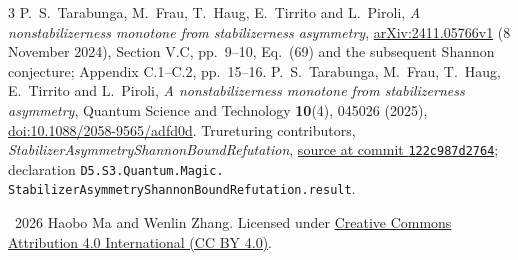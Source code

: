 \documentclass[11pt]{article}
\begin{document}
\begin{thebibliography}{3}
 P.~S.~Tarabunga, M.~Frau, T.~Haug, E.~Tirrito and L.~Piroli,
\emph{A nonstabilizerness monotone from stabilizerness asymmetry},
\href{https://arxiv.org/abs/2411.05766v1}{arXiv:2411.05766v1} (8 November 2024),
Section V.C, pp.~9--10, Eq.~(69) and the subsequent Shannon conjecture;
Appendix C.1--C.2, pp.~15--16.
 P.~S.~Tarabunga, M.~Frau, T.~Haug, E.~Tirrito and L.~Piroli,
\emph{A nonstabilizerness monotone from stabilizerness asymmetry},
Quantum Science and Technology \textbf{10}(4), 045026 (2025),
\href{https://doi.org/10.1088/2058-9565/adfd0d}{doi:10.1088/2058-9565/adfd0d}.
 Trureturing contributors,
\emph{StabilizerAsymmetryShannonBoundRefutation},
\href{https://github.com/the-omega-institute/trureturing/blob/122c987d276498783de7d873378a28b27ced8761/D5/S3/Quantum/Magic/StabilizerAsymmetryShannonBoundRefutation.lean}{source at commit \texttt{122c987d2764}};
declaration \texttt{D5.S3.Quantum.Magic.}\\
\texttt{StabilizerAsymmetryShannonBoundRefutation.result}.
\end{thebibliography}
\noindent\small\textcopyright\ 2026 Haobo Ma and Wenlin Zhang.
Licensed under \href{https://creativecommons.org/licenses/by/4.0/}{Creative Commons Attribution 4.0 International (CC BY 4.0)}.
\end{document}
